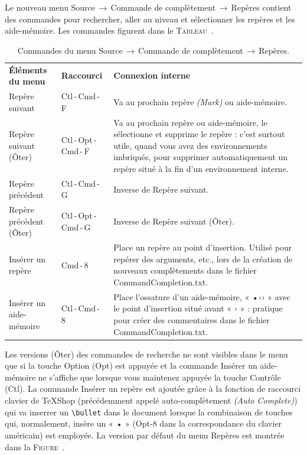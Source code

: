 \documentclass[11pt,french]{article}
\newcommand{\optkey}{\textsf{Opt}}
\newcommand{\ctlkey}{\textsf{Ctl}}
\newcommand{\cmdkey}{\textsf{Cmd}}
\newcommand{\mnu}[1]{\textsf{#1}}
\newcommand{\To}{\,\(\to\)\,}
\newcommand{\TS}{\textsf{\TeX Shop}}
\newcommand{\CCT}{\textsf{CommandCompletion.txt}}
\begin{document}
Le nouveau menu \mnu{Source}\To\mnu{Commande de complètement}\To\mnu{Repères} contient des commandes pour 
rechercher, aller au niveau et sélectionner les repères et les aide-mémoire. Les commandes figurent 
dans le \textsc{Tableau}~.
\begin{table}[htbp]
\centering
\caption{Commandes du menu \mnu{Source}\To\mnu{Commande de complètement}\To\mnu{Repères}.\label{tbl:menu}}
\begin{tabular}{l l p{6.6cm}}
{\bfseries Éléments du menu} & {\bfseries Raccourci} & {\bfseries Connexion interne} \\
\cmidrule[0.5pt](lr){1-1} \cmidrule[0.5pt](lr){2-2} \cmidrule[0.5pt](lr){3-3}
\sffamily Repère suivant &  \ctlkey\,-\,\cmdkey\,-\,\textsf{F} & Va au prochain repère \emph{(Mark)} ou aide-mémoire. \\
\sffamily Repère suivant (Ôter) & \ctlkey\,-\,\optkey\,-\,\cmdkey\,-\,\textsf{F} & Va au prochain repère ou aide-mémoire, le sélectionne et supprime le repère : c'est surtout utile, quand vous avez des environnements imbriqués, pour supprimer automatiquement un repère situé à la fin d'un environnement interne.\\
\sffamily Repère précédent & \ctlkey\,-\,\cmdkey\,-\,\textsf{G} & Inverse de \textsf{Repère suivant}. \\
\sffamily Repère précédent (Ôter) & \ctlkey\,-\,\optkey\,-\,\cmdkey\,-\,\textsf{G} & Inverse de \textsf{Repère suivant (Ôter)}.  \\
\sffamily Insérer un repère & \cmdkey\,-\,\textsf{8} & Place un repère au point d'insertion. Utilisé pour repérer des arguments, etc., lors de la création de nouveaux complètements dans le fichier \CCT. \\
\sffamily Insérer un aide-mémoire & \ctlkey\,-\,\cmdkey\,-\,\textsf{8} & Place l'ossature d'un aide-mémoire, « •‹› » avec le point d'insertion situé avant « › » : pratique pour créer des commentaires dans le fichier \CCT. \\
\end{tabular}
\end{table}
Les versions \mnu{(Ôter)} des commandes de recherche ne sont visibles dans le menu que si la touche Option (\optkey) est appuyée et la commande \mnu{Insérer un aide-mémoire} ne s'affiche que lorsque vous maintenez appuyée la touche Contrôle (\ctlkey). La commande \mnu{Insérer un repère} est ajoutée grâce à la fonction de raccourci clavier de \TS{} (précédemment appelé auto-complètement \emph{(Auto Complete)}) qui va inserrer un \texttt{\textbackslash bullet} dans le document lorsque la combinaison de touches qui, normalement, insère un « • » (\mnu{\optkey-8} dans la correspondance du clavier américain) est employée. La version par défaut du menu \mnu{Repères} est montrée dans la \textsc{Figure}~.  
\end{document}
